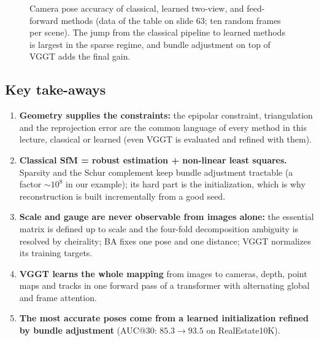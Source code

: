 \documentclass[11pt,a4paper]{article}
\theoremstyle{definition}
\theoremstyle{plain}
\theoremstyle{remark}
\begin{document}
\begin{figure}[H]
\centering
{}
\caption{Camera pose accuracy of classical, learned two-view, and feed-forward methods (data of the table on slide 63; ten random frames per scene). The jump from the classical pipeline to learned methods is largest in the sparse regime, and bundle adjustment on top of VGGT adds the final gain.}
\end{figure}

\subsection*{Key take-aways}
\begin{enumerate}
\item \textbf{Geometry supplies the constraints:} the epipolar constraint, triangulation and the reprojection error are the common language of every method in this lecture, classical or learned (even VGGT is evaluated and refined with them).
\item \textbf{Classical SfM = robust estimation + non-linear least squares.} Sparsity and the Schur complement keep bundle adjustment tractable (a factor $\sim10^8$ in our example); its hard part is the initialization, which is why reconstruction is built incrementally from a good seed.
\item \textbf{Scale and gauge are never observable from images alone:} the essential matrix is defined up to scale and the four-fold decomposition ambiguity is resolved by cheirality; BA fixes one pose and one distance; VGGT normalizes its training targets.
\item \textbf{VGGT learns the whole mapping} from images to cameras, depth, point maps and tracks in one forward pass of a transformer with alternating global and frame attention.
\item \textbf{The most accurate poses come from a learned initialization refined by bundle adjustment} (AUC@30: $85.3\to93.5$ on RealEstate10K).
\end{enumerate}
\end{document}
